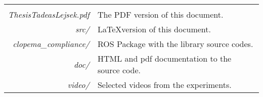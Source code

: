 %
 \label{sec:appendix}
    \begin{tabular}{rl}
    & \\[.5cm]
      \textit{ThesisTadeasLejsek.pdf} & The PDF version of this document.\\
        \textit{src/} & \LaTeX version of this document.\\
        \textit{clopema\_compliance/} & ROS Package with the library source codes.\\
        \textit{doc/} & HTML and pdf documentation to the source code.\\
        \textit{video/} & Selected videos from the experiments.\\
    \end{tabular}
    \clearpage

%     